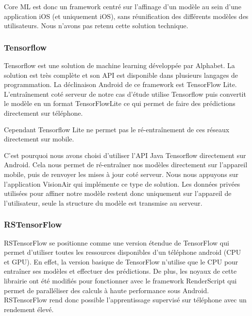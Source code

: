 \documentclass{article}
\begin{document}
Core ML est donc un framework centré sur l'affinage d'un modèle au sein d'une application iOS (et uniquement iOS), sans réunification des différents modèles des utilisateurs. Nous n'avons pas retenu cette solution technique.

\subsubsection{Tensorflow}

Tensorflow est une solution de machine learning développée par Alphabet. La solution est très complète et son API est disponible dans plusieurs langages de programmation. La déclinaison Android de ce framework est TensorFlow Lite. L'entraînement coté serveur de notre cas d'étude utilise Tensorflow puis convertit le modèle en un format TensorFlowLite ce qui permet de faire des prédictions directement sur téléphone.

Cependant Tensorflow Lite ne permet pas le ré-entraînement de ces réseaux directement sur mobile.

C'est pourquoi nous avons choisi d'utiliser l'API Java Tensorflow directement sur Android. Cela nous permet de ré-entraîner nos modèles directement sur l'appareil mobile, puis de renvoyer les mises à jour coté serveur. Nous nous appuyons sur l'application VisionAir qui implémente ce type de solution\cite{DivyanshuSharmaImplementingFederatedLearning}. Les données privées utilisées pour affiner notre modèle restent donc uniquement sur l'appareil de l'utilisateur, seule la structure du modèle est transmise au serveur.

\subsubsection{RSTensorFlow}

RSTensorFlow se positionne comme une version étendue de TensorFlow qui permet d'utiliser toutes les ressources disponibles d'un téléphone android (CPU et GPU). En effet, la version basique de TensorFlow n'utilise que le CPU pour entraîner ses modèles et effectuer des prédictions. \cite{AlzantotRSTensorFlowGPUEnabled2017} \newline
De plus, les noyaux de cette librairie ont été modifiés pour fonctionner avec le framework RenderScript qui permet de paralléliser des calculs à haute performance sous Android. RSTensorFlow rend donc possible l'apprentissage supervisé sur téléphone avec un rendement élevé. 
\end{document}
